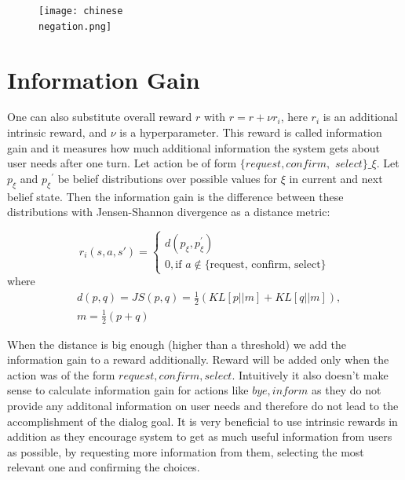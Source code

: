 \documentclass[12pt,titlepage,a4paper]{article}
\begin{document}
\begin{figure}
    \centering
    \texttt{[image: chinese\\ negation.png]}
    \caption{}
    \label{diag:negation}
\end{figure}


\section{Information Gain}

One can also substitute overall reward $r$ with $r = r + \nu r_i$, here $r_i$ is an additional intrinsic reward, and $\nu$ is a hyperparameter. This reward is called information gain and it measures how much additional information the system gets about user needs after one turn. Let action be of form $\{request, confirm,$ $select\}\_\xi$. Let $p_{\xi}$ and ${p_{\xi}}^\prime$ be belief distributions over possible values for $\xi$ in current and next belief state. Then the informa\-tion gain is the difference between these distributions with Jensen-Shannon divergence as a distance metric:

\begin{equation}
    r_i(s, a, s\prime) =
    \begin{cases}
        d(p_{\xi}, p_{\xi}^\prime) \\
        0, \text{if } a \notin \text{\{request, confirm, select\}}
    \end{cases}
\end{equation}
where
\begin{equation}
    \begin{aligned}
        &d(p, q) = JS(p,q) = \frac{1}{2}(KL[p||m] + KL[q||m]), \\
        &m = \frac{1}{2}(p + q)
    \end{aligned}
\end{equation}

When the distance is big enough (higher than a threshold) we add the information gain to a reward additionally. Reward will be added only when the action was of the form ${request, confirm, select}$. Intuitively it also doesn't make sense to calculate information gain for actions like $bye, inform$ as they do not provide any additonal information on user needs and therefore do not lead to the accomplishment of the dialog goal. It is very beneficial to use intrinsic rewards in addition as they encourage system to get as much useful information from users as possible, by requesting more information from them, selecting the most relevant one and confirming the choices.
\end{document}
